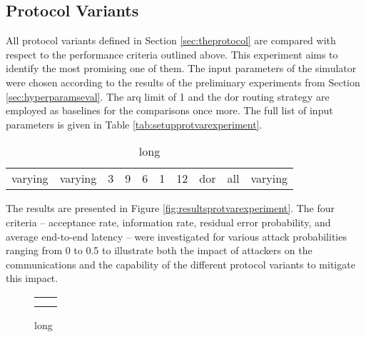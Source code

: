 \subsection{Protocol Variants}
All protocol variants defined in Section \ref{sec:theprotocol} are compared with respect to the performance criteria outlined above. This experiment
aims to identify the most promising one of them. The input parameters of the simulator were chosen according to the results of the preliminary
experiments from Section \ref{sec:hyperparamseval}. The \gls{arq} limit of 1 and the \gls{dor} routing strategy are employed as baselines for the
comparisons once more. The full list of input parameters is given in Table \vref{tab:setupprotvarexperiment}.

\begin{table}
    \centering
    \begin{tabulary}{\textwidth}{C|C|C|C|C|C|C|C|C|C}
        \pProtVar{} & \pNCMode{} & \pEncMods{} & \pAuthMods{} & \pRQSize{} & \pARQLimit{} & \pARQTimeout{} & \pRStrat{} & \pAttackerSet{} & \pAttackProb{} \\\hline
        varying & varying & 3 & 9 & 6 & 1 & 12 & \gls{dor} & all & varying \\
    \end{tabulary}
    \caption[Input parameters for protocol variant experiment]{long}
    \label{tab:setupprotvarexperiment}
\end{table}

The results are presented in Figure \vref{fig:resultsprotvarexperiment}. The four criteria -- acceptance rate, information rate, residual error
probability, and average end-to-end latency -- were investigated for various attack probabilities ranging from 0 to 0.5 to illustrate both the impact
of attackers on the communications and the capability of the different protocol variants to mitigate this impact.

\begin{figure}
    \centering
    \begin{tabular}{ll}
         &  \\
         & 
    \end{tabular}
    \caption[Results for protocol variant experiment]{long}
    \label{fig:resultsprotvarexperiment}
\end{figure}

